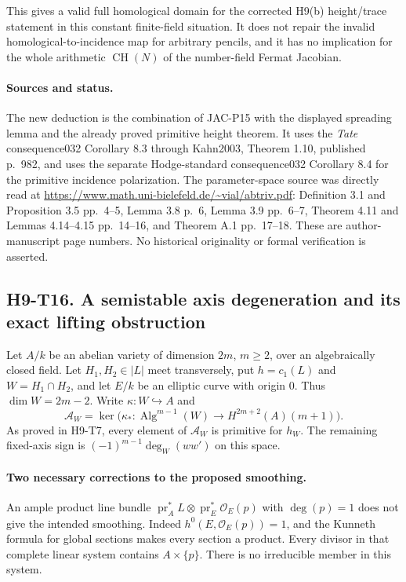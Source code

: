 \documentclass[11pt,a4paper]{article}
\begin{document}
This gives a valid full homological domain for the corrected H9(b)
height/trace statement in this constant finite-field situation. It
does not repair the invalid homological-to-incidence map for arbitrary
pencils, and it has no implication for the whole arithmetic
$\operatorname{CH}(N)$ of the number-field Fermat Jacobian.

\paragraph{Sources and status.}
The new deduction is the combination of JAC-P15 with the displayed
spreading lemma and the already proved primitive height theorem.
It uses the \emph{Tate} consequence032 Corollary 8.3 through
Kahn2003, Theorem 1.10, published p.~982, and uses the separate
Hodge-standard consequence032 Corollary 8.4 for the primitive
incidence polarization. The parameter-space source was directly read
at \url{https://www.math.uni-bielefeld.de/~vial/abtriv.pdf}:
Definition 3.1 and Proposition 3.5 pp.~4--5, Lemma 3.8 p.~6,
Lemma 3.9 pp.~6--7, Theorem 4.11 and Lemmas 4.14--4.15 pp.~14--16,
and Theorem A.1 pp.~17--18. These are author-manuscript page numbers.
No historical originality or formal verification is asserted.



\subsection*{H9-T16. A semistable axis degeneration and its exact lifting obstruction}

Let $A/k$ be an abelian variety of dimension $2m$, $m\ge2$, over an
algebraically closed field. Let $H_1,H_2\in|L|$ meet transversely,
put $h=c_1(L)$ and $W=H_1\cap H_2$, and let $E/k$ be an elliptic
curve with origin $0$. Thus $\dim W=2m-2$. Write
$\kappa:W\hookrightarrow A$ and
\[
 \mathcal A_W=\ker\bigl(\kappa_*:
  \operatorname{Alg}^{m-1}(W)\longrightarrow H^{2m+2}(A)(m+1)\bigr).
\]
As proved in H9-T7, every element of $\mathcal A_W$ is primitive
for $h_W$. The remaining fixed-axis sign is
$(-1)^{m-1}\deg_W(ww')$ on this space.

\paragraph{Two necessary corrections to the proposed smoothing.}
An ample product line bundle
$\operatorname{pr}_A^*L\otimes\operatorname{pr}_E^*\mathcal O_E(p)$
with $\deg(p)=1$ does not give the intended smoothing. Indeed
$h^0(E,\mathcal O_E(p))=1$, and the Kunneth formula for global
sections makes every section a product. Every divisor in that
complete linear system contains $A\times\{p\}$. There is no
irreducible member in this system.
\end{document}
